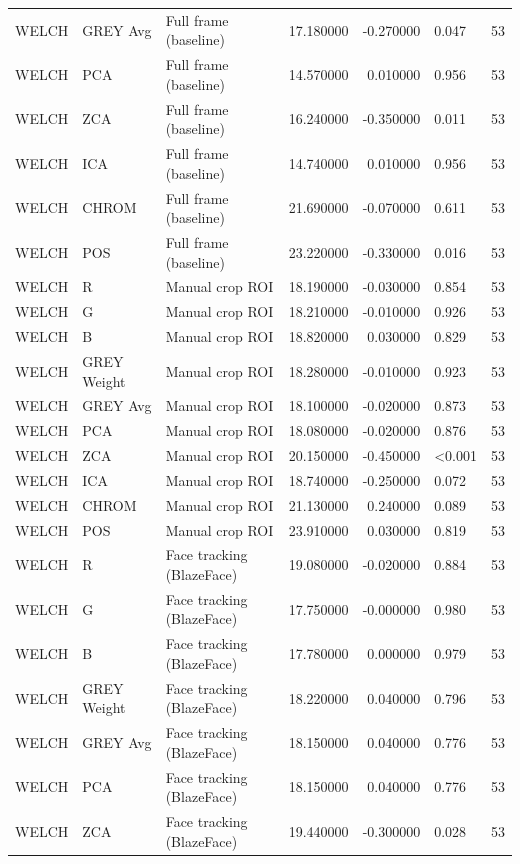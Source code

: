 \begin{table}[htbp]
\begin{tabular}{l l l r r l r}
WELCH & GREY Avg & Full frame (baseline) & 17.180000 & -0.270000 & 0.047 & 53 \\
WELCH & PCA & Full frame (baseline) & 14.570000 & 0.010000 & 0.956 & 53 \\
WELCH & ZCA & Full frame (baseline) & 16.240000 & -0.350000 & 0.011 & 53 \\
WELCH & ICA & Full frame (baseline) & 14.740000 & 0.010000 & 0.956 & 53 \\
WELCH & CHROM & Full frame (baseline) & 21.690000 & -0.070000 & 0.611 & 53 \\
WELCH & POS & Full frame (baseline) & 23.220000 & -0.330000 & 0.016 & 53 \\
WELCH & R & Manual crop ROI & 18.190000 & -0.030000 & 0.854 & 53 \\
WELCH & G & Manual crop ROI & 18.210000 & -0.010000 & 0.926 & 53 \\
WELCH & B & Manual crop ROI & 18.820000 & 0.030000 & 0.829 & 53 \\
WELCH & GREY Weight & Manual crop ROI & 18.280000 & -0.010000 & 0.923 & 53 \\
WELCH & GREY Avg & Manual crop ROI & 18.100000 & -0.020000 & 0.873 & 53 \\
WELCH & PCA & Manual crop ROI & 18.080000 & -0.020000 & 0.876 & 53 \\
WELCH & ZCA & Manual crop ROI & 20.150000 & -0.450000 & <0.001 & 53 \\
WELCH & ICA & Manual crop ROI & 18.740000 & -0.250000 & 0.072 & 53 \\
WELCH & CHROM & Manual crop ROI & 21.130000 & 0.240000 & 0.089 & 53 \\
WELCH & POS & Manual crop ROI & 23.910000 & 0.030000 & 0.819 & 53 \\
WELCH & R & Face tracking (BlazeFace) & 19.080000 & -0.020000 & 0.884 & 53 \\
WELCH & G & Face tracking (BlazeFace) & 17.750000 & -0.000000 & 0.980 & 53 \\
WELCH & B & Face tracking (BlazeFace) & 17.780000 & 0.000000 & 0.979 & 53 \\
WELCH & GREY Weight & Face tracking (BlazeFace) & 18.220000 & 0.040000 & 0.796 & 53 \\
WELCH & GREY Avg & Face tracking (BlazeFace) & 18.150000 & 0.040000 & 0.776 & 53 \\
WELCH & PCA & Face tracking (BlazeFace) & 18.150000 & 0.040000 & 0.776 & 53 \\
WELCH & ZCA & Face tracking (BlazeFace) & 19.440000 & -0.300000 & 0.028 & 53 \\

\end{tabular}
\end{table}
